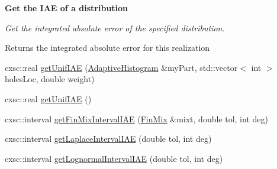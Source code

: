 \begin{Indent}{\bf \-Get the \-I\-A\-E of a distribution}\par
{\em \-Get the integrated absolute error of the specified distribution. \begin{DoxyReturn}{\-Returns}
the integrated absolute error for this realization 
\end{DoxyReturn}
}\begin{DoxyCompactItemize}
\item 
cxsc\-::real \hyperlink{classsubpavings_1_1AdaptiveHistogramCollator_a46870c2d282efef091dfb1b3477aba4f}{get\-Unif\-I\-A\-E} (\hyperlink{classsubpavings_1_1AdaptiveHistogram}{\-Adaptive\-Histogram} \&my\-Part, std\-::vector$<$ int $>$ holes\-Loc, double weight)
\item 
cxsc\-::real \hyperlink{classsubpavings_1_1AdaptiveHistogramCollator_ad9bbae8e4f70d6c40684ab60038807bc}{get\-Unif\-I\-A\-E} ()
\item 
cxsc\-::interval \hyperlink{classsubpavings_1_1AdaptiveHistogramCollator_a2173c80c47c7758c67e5f014f92893e3}{get\-Fin\-Mix\-Interval\-I\-A\-E} (\hyperlink{structFinMix}{\-Fin\-Mix} \&mixt, double tol, int deg)
\item 
cxsc\-::interval \hyperlink{classsubpavings_1_1AdaptiveHistogramCollator_a878b3126be081b4551a802de5d7863b3}{get\-Laplace\-Interval\-I\-A\-E} (double tol, int deg)
\item 
cxsc\-::interval \hyperlink{classsubpavings_1_1AdaptiveHistogramCollator_a85c00aa2a7bdff2b4796c62d052e1447}{get\-Lognormal\-Interval\-I\-A\-E} (double tol, int deg)
\end{DoxyCompactItemize}
\end{Indent}
